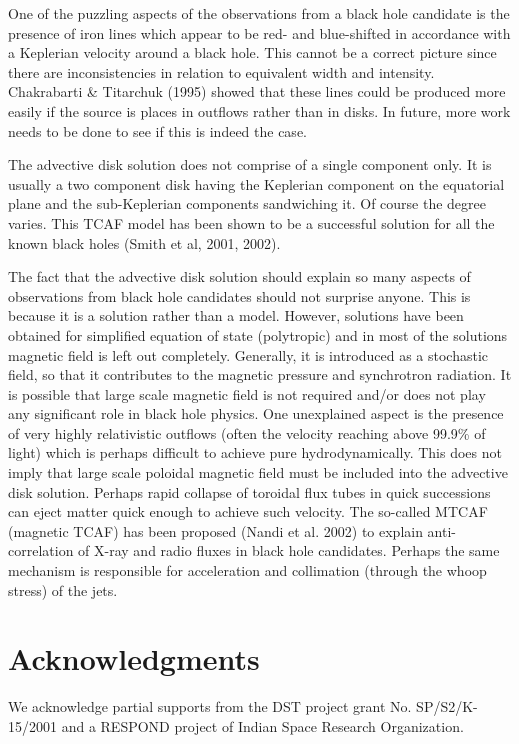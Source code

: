 \documentclass{ws-procs975x65}
\begin{document}
One of the puzzling aspects of the observations from a black hole candidate is the 
presence of iron lines which appear to be red- and blue-shifted in accordance with a 
Keplerian velocity around a black hole. This cannot be a correct picture since
there are inconsistencies in relation to equivalent width and intensity. Chakrabarti
\& Titarchuk (1995) showed that these lines could be produced more easily if the
source is places in outflows rather than in disks. In future, more work needs
to be done to see if this is indeed the case. 

The advective disk solution does not comprise of a single component only. It is
usually a two component disk having the Keplerian component on the equatorial plane 
and the sub-Keplerian components sandwiching it. Of course the degree varies.
This TCAF model has been shown to be a successful solution for all the known black holes
(Smith et al, 2001, 2002). 

The fact that the advective disk solution should explain so many aspects of observations from 
black hole candidates should not surprise anyone. This is because it is a solution rather than a 
model. However, solutions have been obtained for simplified equation of state (polytropic) and
in most of the solutions magnetic field is left out completely. Generally, it is introduced
as a stochastic field, so that it contributes to the magnetic pressure and synchrotron radiation.
It is possible that large scale magnetic field is not required and/or does not play any significant role
in black hole physics. One unexplained aspect is the presence of very highly relativistic outflows 
(often the velocity reaching above 99.9\% of light) which is perhaps difficult to achieve pure hydrodynamically.
This does not imply that large scale poloidal magnetic field must be included into the advective disk
solution. Perhaps rapid collapse of toroidal flux tubes in quick successions can eject matter
quick enough to achieve such velocity. The so-called MTCAF (magnetic TCAF) has been proposed
(Nandi et al. 2002) to explain anti-correlation of X-ray and radio fluxes in black hole
candidates. Perhaps the same mechanism is responsible for acceleration and collimation (through the
whoop stress) of the jets.

\section*{Acknowledgments} 
We acknowledge partial supports from the DST project grant No.  SP/S2/K-15/2001 and a RESPOND project
of Indian Space Research Organization.
\end{document}
